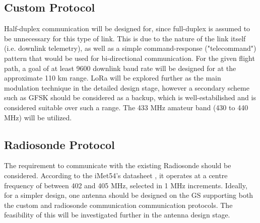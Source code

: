 \subsection{Custom Protocol}
Half-duplex communication will be designed for, since full-duplex is assumed to be unnecessary for this type of link. This is due to the nature of the link itself (i.e. downlink telemetry), as well as a simple command-response ("telecommand") pattern that would be used for bi-directional communication. For the given flight path, a goal of at least 9600 downlink baud rate will be designed for at the approximate 110 km range. LoRa will be explored further as the main modulation technique in the detailed design stage, however a secondary scheme such as GFSK should be considered as a backup, which is well-estabilished and is considered suitable over such a range. The 433 MHz amateur band (430 to 440 MHz) will be utilized.

\subsection{Radiosonde Protocol}
The requirement to communicate with the existing Radiosonde should be considered. According to the iMet54's datasheet \cite{datasheet-iMet54}, it operates at a centre frequency of between 402 and 405 MHz, selected in 1 MHz increments. Ideally, for a simpler design, one antenna should be designed on the GS supporting both the custom and radiosonde communication communication protocols. The feasibility of this will be investigated further in the antenna design stage.